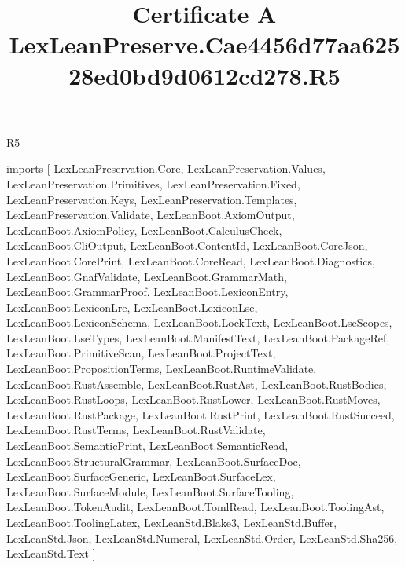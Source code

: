 \begin{lexlean}{R5}
\title{Certificate A LexLeanPreserve.Cae4456d77aa62528ed0bd9d0612cd278.R5}
\begin{coremodule}
imports [
  LexLeanPreservation.Core,
  LexLeanPreservation.Values,
  LexLeanPreservation.Primitives,
  LexLeanPreservation.Fixed,
  LexLeanPreservation.Keys,
  LexLeanPreservation.Templates,
  LexLeanPreservation.Validate,
  LexLeanBoot.AxiomOutput,
  LexLeanBoot.AxiomPolicy,
  LexLeanBoot.CalculusCheck,
  LexLeanBoot.CliOutput,
  LexLeanBoot.ContentId,
  LexLeanBoot.CoreJson,
  LexLeanBoot.CorePrint,
  LexLeanBoot.CoreRead,
  LexLeanBoot.Diagnostics,
  LexLeanBoot.GnafValidate,
  LexLeanBoot.GrammarMath,
  LexLeanBoot.GrammarProof,
  LexLeanBoot.LexiconEntry,
  LexLeanBoot.LexiconLre,
  LexLeanBoot.LexiconLse,
  LexLeanBoot.LexiconSchema,
  LexLeanBoot.LockText,
  LexLeanBoot.LseScopes,
  LexLeanBoot.LseTypes,
  LexLeanBoot.ManifestText,
  LexLeanBoot.PackageRef,
  LexLeanBoot.PrimitiveScan,
  LexLeanBoot.ProjectText,
  LexLeanBoot.PropositionTerms,
  LexLeanBoot.RuntimeValidate,
  LexLeanBoot.RustAssemble,
  LexLeanBoot.RustAst,
  LexLeanBoot.RustBodies,
  LexLeanBoot.RustLoops,
  LexLeanBoot.RustLower,
  LexLeanBoot.RustMoves,
  LexLeanBoot.RustPackage,
  LexLeanBoot.RustPrint,
  LexLeanBoot.RustSucceed,
  LexLeanBoot.RustTerms,
  LexLeanBoot.RustValidate,
  LexLeanBoot.SemanticPrint,
  LexLeanBoot.SemanticRead,
  LexLeanBoot.StructuralGrammar,
  LexLeanBoot.SurfaceDoc,
  LexLeanBoot.SurfaceGeneric,
  LexLeanBoot.SurfaceLex,
  LexLeanBoot.SurfaceModule,
  LexLeanBoot.SurfaceTooling,
  LexLeanBoot.TokenAudit,
  LexLeanBoot.TomlRead,
  LexLeanBoot.ToolingAst,
  LexLeanBoot.ToolingLatex,
  LexLeanStd.Blake3,
  LexLeanStd.Buffer,
  LexLeanStd.Json,
  LexLeanStd.Numeral,
  LexLeanStd.Order,
  LexLeanStd.Sha256,
  LexLeanStd.Text
]


\end{coremodule}
\end{lexlean}
